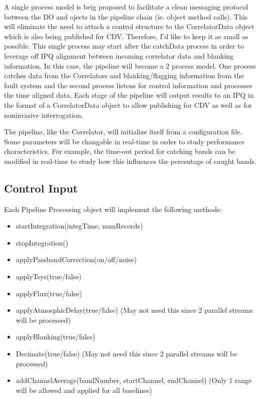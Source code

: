 \documentclass[11pt]{article}
\begin{document}
A single process model is beig proposed to facilitate a clean messaging
protocol between the DO and ojects in the pipeline chain
(ie. object method calls).
This will eliminate the need to attach a control structure to the
CorrelatorData object which is also being published for
CDV. Therefore, I'd like to keep it as small as possible.
This single process may
start after the catchData process in order to leverage off IPQ alignment
between incoming correlator data and blanking information. In
this case, the pipeline will become a 2 process model. One process
catches data from the Correlators and blanking/flagging information from
the fault system and the second process listens for control information and
processes the time aligned data. 
Each stage of the pipeline will output results to an IPQ in the format
of a CorrelatorData object to allow publishing for CDV as well as
for noninvasive interrogation.

The pipeline, like the Correlator, will initialize itself from a configuration
file. Some parameters will be changable in real-time in order to study
performance characteristics. For example, the time-out period for catching
bands can be modified in real-time to study how this influences the
percentage of caught bands.

\subsection{Control Input}
Each Pipeline Processing object will implement the following methods:

\begin{itemize}
\item startIntegration(integTime, numRecords)
\item stopIntegration()
\item applyPassbandCorrection(on/off/noise)
\item applyTsys(true/false)
\item applyFlux(true/false)
\item applyAtmosphicDelay(true/false)
 (May not need this since 2 parallel streams will be processed)
\item applyBlanking(true/false)
\item Decimate(true/false)
 (May not need this since 2 parallel streams will be processed)
\item addChannelAverage(bandNumber, startChannel, endChannel)
 (Only 1 range will be allowed and applied for all baselines)
\end{itemize}
\end{document}
